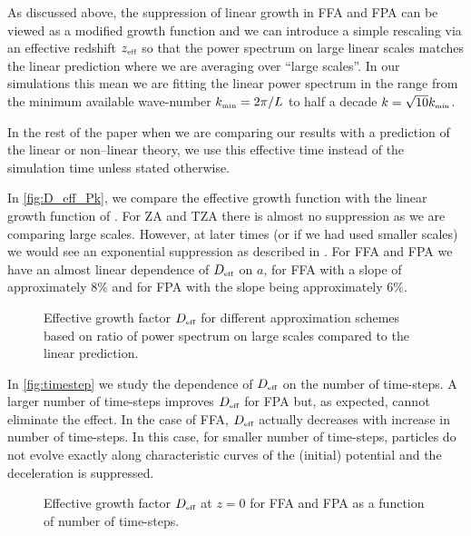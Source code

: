 As discussed above, the suppression of linear growth in FFA and FPA can be viewed as a modified growth function and we can introduce a simple rescaling via an effective redshift $z_\text{\tiny eff}$ so that the power spectrum on large linear scales matches the linear prediction
where we are averaging over ``large scales''. In our simulations this mean we are fitting the linear power spectrum in the range from the minimum available wave-number $k_\text{\tiny min}=2\pi/L$ to half a decade $k=\sqrt{10}k_\text{\tiny min}$.

In the rest of the paper when we are comparing our results with a prediction of the linear or non--linear theory, we use this effective time instead of the simulation time unless stated otherwise.

In \autoref{fig:D_eff_Pk}, we compare the effective growth function with the linear growth function of \LCDM. For ZA and TZA there is almost no suppression as we are comparing large scales. However, at later times (or if we had used smaller scales) we would see an exponential suppression as described in \cite{Bharadwaj_1996}. For FFA and FPA we have an almost linear dependence of $D_\text{\tiny eff}$ on $a$, for FFA with a slope of approximately $8\%$ and for FPA with the slope being approximately $6\%$.
\begin{figure}[bt]
  \centering
    \begin{subfigure}{0.9\textwidth}
	\end{subfigure}
	\begin{subfigure}{0.9\textwidth}
	\end{subfigure}
  \caption{Effective growth factor $D_\text{\tiny eff}$ for different approximation schemes based on ratio of power spectrum on large scales compared to the linear prediction.}
  \label{fig:D_eff_Pk}
\end{figure}

In \autoref{fig:timestep} we study the dependence of $D_\text{\tiny eff}$ on the number of time-steps. A larger number of time-steps improves $D_\text{\tiny eff}$ for FPA but, as expected, cannot eliminate the effect. In the case of FFA, $D_\text{\tiny eff}$ actually decreases with increase in number of time-steps. In this case, for smaller number of time-steps, particles do not evolve exactly along characteristic curves of the (initial) potential and the deceleration is suppressed.
\begin{figure}[bt]
  \centering
    \begin{subfigure}{0.9\textwidth}
	\end{subfigure}
	\begin{subfigure}{0.9\textwidth}
	\end{subfigure}
  \caption{Effective growth factor $D_\text{\tiny eff}$ at $z=0$ for FFA and FPA as a function of number of time-steps.}
  \label{fig:timestep}
\end{figure}

